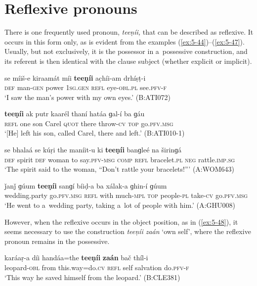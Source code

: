 \section{Reflexive pronouns}
\label{sec:5-5}

There is one frequently used pronoun, \textit{teeṇíi,} that can be described as reflexive. It
occurs in this form only, as is evident from the examples (\ref{ex:5-44})--(\ref{ex:5-47}). Usually, but not
exclusively, it is the possessor in a~possessive construction, and its referent is then identical
with the clause subject (whether explicit or implicit).

\begin{exe}
\ex
\label{ex:5-44}
\gll se míiš-e kiraamát míi \textbf{teeṇíi} ac̣híi-am drhíṣṭ-i\\
\textsc{def} man-\textsc{gen} power \textsc{1sg.gen} \textsc{refl} eye-\textsc{obl.pl} see.\textsc{pfv-f}\\
\glt `I saw the man's power with my own eyes.' (B:ATI072)

\ex
\label{ex:5-45}
\gll \textbf{teeṇíi} ak putr kaarél thaní hatáa ɡal-í ba ɡáu \\
\textsc{refl} one son Carel \textsc{quot} there throw-\textsc{cv} \textsc{top} go.\textsc{pfv.msg}\\
\glt `[He] left his son, called Carel, there and left.' (B:ATI010-1)

\ex
\label{ex:5-46}
\gll se bhalaá se kúṛi the maníit-u ki \textbf{teeṇíi} banɡleé na širinɡá\\
\textsc{def} spirit \textsc{def} woman to say.\textsc{pfv-msg} \textsc{comp} \textsc{refl} bracelet.\textsc{pl} \textsc{neg} rattle.\textsc{imp.sg}\\
\glt `The spirit said to the woman, ``Don't rattle your bracelets!''' (A:WOM643)

\ex
\label{ex:5-47}
\gll ǰanǰ ɡúum \textbf{teeṇíi} sanɡí bíiḍ-a ba xálak-a ɡhin-í ɡúum\\
wedding.party go.\textsc{pfv.msg } \textsc{refl} with much-\textsc{mpl} \textsc{top} people-\textsc{pl} take-\textsc{cv} go.\textsc{pfv.msg}\\
\glt `He went to a~wedding party, taking a~lot of people with him.' (A:GHU008)
\end{exe}
However, when the reflexive occurs in the object position, as in (\ref{ex:5-48}), it seems necessary to use the construction \textit{teeṇíi zaán} `own self', where the reflexive pronoun remains in the possessive.
\begin{exe}
\ex
\label{ex:5-48}
\gll karáaṛ-a díi handáa=the \textbf{teeṇíi} \textbf{zaán} bač thíl-i\\
leopard-\textsc{obl} from this.way=do.\textsc{cv} \textsc{refl} self salvation do.\textsc{pfv-f}\\
\glt `This way he saved himself from the leopard.' (B:CLE381)
\end{exe}

